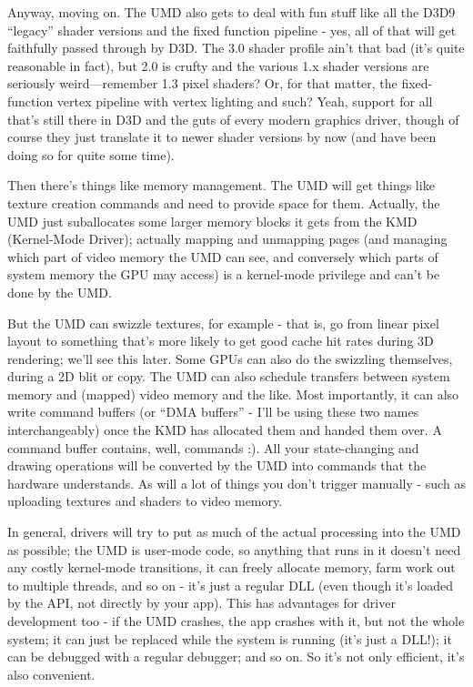 Anyway, moving on. The UMD also gets to deal with fun stuff like all the D3D9
``legacy'' shader versions and the fixed function pipeline - yes, all of that
will get faithfully passed through by D3D. The 3.0 shader profile ain't that
bad (it's quite reasonable in fact), but 2.0 is crufty and the various 1.x
shader versions are seriously weird---remember 1.3 pixel shaders? Or, for that
matter, the fixed-function vertex pipeline with vertex lighting and such? Yeah,
support for all that's still there in D3D and the guts of every modern graphics
driver, though of course they just translate it to newer shader versions by now
(and have been doing so for quite some time).

Then there's things like memory management. The UMD will get things like
texture creation commands and need to provide space for them. Actually, the UMD
just suballocates some larger memory blocks it gets from the KMD (Kernel-Mode
Driver); actually mapping and unmapping pages (and managing which part of video
memory the UMD can see, and conversely which parts of system memory the GPU may
access) is a kernel-mode privilege and can't be done by the UMD.

But the UMD can swizzle textures, for example - that is, go from linear pixel
layout to something that's more likely to get good cache hit rates during 3D
rendering; we'll see this later. Some GPUs can also do the swizzling
themselves, during a 2D blit or copy. The UMD can also schedule transfers
between system memory and (mapped) video memory and the like. Most importantly,
it can also write command buffers (or ``DMA buffers'' - I'll be using these two
names interchangeably) once the KMD has allocated them and handed them over. A
command buffer contains, well, commands :). All your state-changing and drawing
operations will be converted by the UMD into commands that the hardware
understands. As will a lot of things you don't trigger manually - such as
uploading textures and shaders to video memory.

In general, drivers will try to put as much of the actual processing into the
UMD as possible; the UMD is user-mode code, so anything that runs in it doesn't
need any costly kernel-mode transitions, it can freely allocate memory, farm
work out to multiple threads, and so on - it's just a regular DLL (even though
it's loaded by the API, not directly by your app). This has advantages for
driver development too - if the UMD crashes, the app crashes with it, but not
the whole system; it can just be replaced while the system is running (it's
just a DLL!); it can be debugged with a regular debugger; and so on. So it's
not only efficient, it's also convenient.

